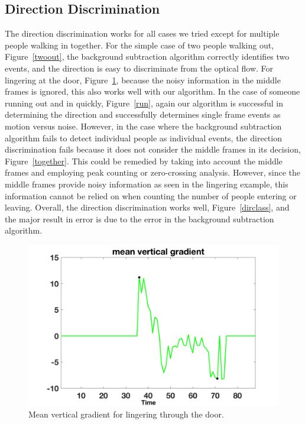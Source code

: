 \documentclass[12pt,oneside]{article} %
\begin{document}
\subsection{Direction Discrimination}  %
The direction discrimination works for all cases we tried except for multiple people walking in together. For the simple case of two people walking out, Figure~\ref{twoout}, the background subtraction algorithm correctly identifies two events, and the direction is easy to discriminate from the optical flow. For lingering at the door, Figure~\ref{linger}, because the noisy information in the middle frames is ignored, this also works well with our algorithm. In the case of someone running out and in quickly, Figure~\ref{run}, again our algorithm is successful in determining the direction and successfully determines single frame events as motion versus noise. However, in the case where the background subtraction algorithm fails to detect individual people as individual events, the direction discrimination fails because it does not consider the middle frames in its decision, Figure~\ref{together}. This could be remedied by taking into account the middle frames and employing peak counting or zero-crossing analysis. However, since the middle frames provide noisy information as seen in the lingering example, this information cannot be relied on when counting the number of people entering or leaving. Overall, the direction discrimination works well, Figure~\ref{dirclass}, and the major result in error is due to the error in the background subtraction algorithm.

\begin{figure}[!htb]
\centering
\includegraphics[scale=0.52]{images/lingerThrough.png}
\caption{Mean vertical gradient for lingering through the door.}
\label{linger}
\end{figure}
\end{document}
